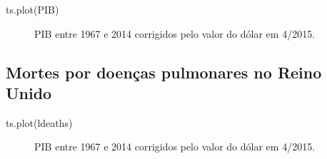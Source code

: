 \documentclass[
  letterpaper,
  DIV=11,
  numbers=noendperiod]{scrreprt}
\newenvironment{Shaded}{\begin{snugshade}}{\end{snugshade}}
\newcommand{\FunctionTok}[1]{\textcolor[rgb]{0.28,0.35,0.67}{#1}}
\newcommand{\NormalTok}[1]{\textcolor[rgb]{0.00,0.23,0.31}{#1}}
\theoremstyle{definition}
\theoremstyle{plain}
\theoremstyle{definition}
\theoremstyle{plain}
\theoremstyle{remark}
\begin{document}
\begin{Shaded}
\begin{Highlighting}[]
\FunctionTok{ts.plot}\NormalTok{(PIB)}
\end{Highlighting}
\end{Shaded}

\begin{figure}

\begin{minipage}[t]{\linewidth}

{\centering 


\caption{PIB entre 1967 e 2014 corrigidos pelo valor do dólar em
4/2015.}

}

\end{minipage}%

\end{figure}

\hypertarget{mortes-por-doenuxe7as-pulmonares-no-reino-unido}{%
\subsection{Mortes por doenças pulmonares no Reino
Unido}\label{mortes-por-doenuxe7as-pulmonares-no-reino-unido}}

\begin{Shaded}
\begin{Highlighting}[]
\FunctionTok{ts.plot}\NormalTok{(ldeaths)}
\end{Highlighting}
\end{Shaded}

\begin{figure}

\begin{minipage}[t]{\linewidth}

{\centering 


\caption{PIB entre 1967 e 2014 corrigidos pelo valor do dólar em
4/2015.}

}

\end{minipage}%

\end{figure}
\end{document}
